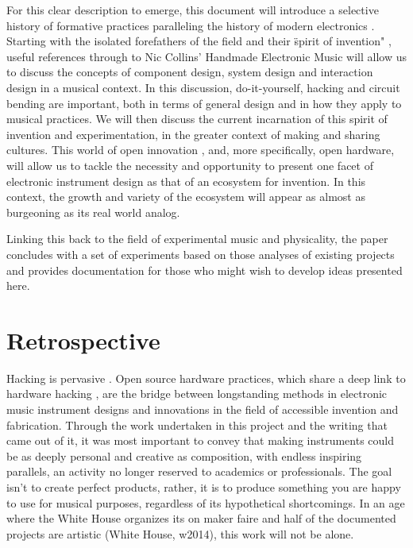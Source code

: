 	For this clear description to emerge, this document will introduce a selective history of formative practices paralleling the history of modern electronics \cite{holmes2002}. Starting with the isolated forefathers of the field and their \"spirit of invention" \cite{dunn2001}, useful references through to Nic Collins' Handmade Electronic Music \cite{collins2006} will allow us to discuss the concepts of component design, system design and interaction design in a musical context. In this discussion, do-it-yourself, hacking and circuit bending are important, both in terms of general design and in how they apply to musical practices. We will then discuss the current incarnation of this spirit of invention and experimentation, in the greater context of making and sharing cultures. This world of open innovation \cite{christensen2005}, and, more specifically, open hardware, will allow us to tackle the necessity and opportunity to present one facet of electronic instrument design as that of an ecosystem for invention. In this context, the growth and variety of the ecosystem will appear as almost as burgeoning as its real world analog. 

	Linking this back to the field of experimental music and physicality, the paper concludes with a set of experiments based on those analyses of existing projects and provides documentation for those who might wish to develop ideas presented here.

\section{Retrospective}

Hacking is pervasive \cite{paradiso2008}. Open source hardware practices, which share a deep link to hardware hacking \cite{williams2012}, are the bridge between longstanding methods in electronic music instrument designs and innovations in the field of accessible invention and fabrication. Through the work undertaken in this project and the writing that came out of it, it was most important to convey that making instruments could be as deeply personal and creative as composition, with endless inspiring parallels, an activity no longer reserved to academics or professionals. The goal isn't to create perfect products, rather, it is to produce something you are happy to use for musical purposes, regardless of its hypothetical shortcomings. In an age where the White House organizes its on maker faire and half of the documented projects are artistic (White House, w2014), this work will not be alone.
	


